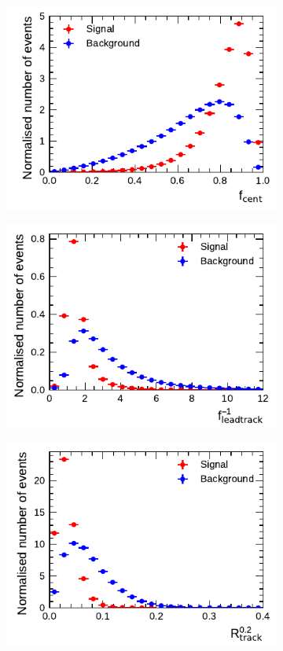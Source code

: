 \begin{figure}[!ht]
  \begin{subfigure}{0.5\textwidth}
    \centering
    \includegraphics{./figures/baseline_bdt_vars/3p/centFrac.pdf}
  \end{subfigure}%
  \begin{subfigure}{0.5\textwidth}
    \centering
    \includegraphics{./figures/baseline_bdt_vars/3p/etOverPtLeadTrk.pdf}
  \end{subfigure}
  \begin{subfigure}{0.5\textwidth}
    \centering
    \includegraphics{./figures/baseline_bdt_vars/3p/innerTrkAvgDist.pdf}

\end{subfigure}
\end{figure}
